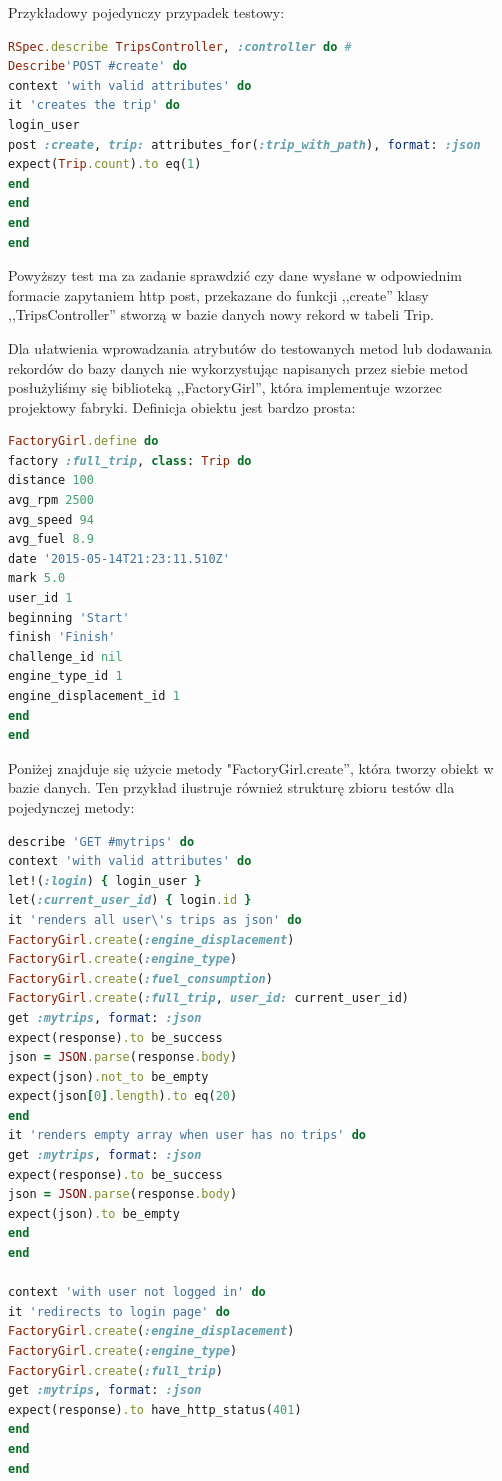 \documentclass[eng,oneside]{mgr}
\begin{document}
Przykładowy pojedynczy przypadek testowy:

\begin{lstlisting}[language=Ruby, caption={RSpec test jednostkowy.}]
RSpec.describe TripsController, :controller do #
Describe'POST #create' do
context 'with valid attributes' do
it 'creates the trip' do
login_user
post :create, trip: attributes_for(:trip_with_path), format: :json
expect(Trip.count).to eq(1)
end
end
end
end
\end{lstlisting}

Powyższy test ma za zadanie sprawdzić czy dane wysłane w odpowiednim formacie zapytaniem http post, przekazane do funkcji ,,create'' klasy ,,TripsController'' stworzą w bazie danych nowy rekord w tabeli Trip. 

Dla ułatwienia wprowadzania atrybutów do testowanych metod lub dodawania rekordów do bazy danych nie wykorzystując napisanych przez siebie metod posłużyliśmy się biblioteką ,,FactoryGirl'', która implementuje wzorzec projektowy fabryki. Definicja obiektu jest bardzo prosta:

\begin{lstlisting}[language=Ruby, caption={Definicja FactoryGirl.}]
FactoryGirl.define do 
factory :full_trip, class: Trip do
distance 100
avg_rpm 2500
avg_speed 94
avg_fuel 8.9
date '2015-05-14T21:23:11.510Z'
mark 5.0
user_id 1
beginning 'Start'
finish 'Finish'
challenge_id nil
engine_type_id 1
engine_displacement_id 1
end
end
\end{lstlisting}

Poniżej znajduje się użycie metody "FactoryGirl.create'', która tworzy obiekt w bazie danych. Ten przykład ilustruje również strukturę zbioru testów dla pojedynczej metody:

\begin{lstlisting}[language=Ruby, caption={Użycie FactoryGirl.}]
describe 'GET #mytrips' do
context 'with valid attributes' do
let!(:login) { login_user }
let(:current_user_id) { login.id }
it 'renders all user\'s trips as json' do
FactoryGirl.create(:engine_displacement)
FactoryGirl.create(:engine_type)
FactoryGirl.create(:fuel_consumption)
FactoryGirl.create(:full_trip, user_id: current_user_id)
get :mytrips, format: :json
expect(response).to be_success
json = JSON.parse(response.body)
expect(json).not_to be_empty
expect(json[0].length).to eq(20)
end
it 'renders empty array when user has no trips' do
get :mytrips, format: :json
expect(response).to be_success
json = JSON.parse(response.body)
expect(json).to be_empty
end
end

context 'with user not logged in' do
it 'redirects to login page' do
FactoryGirl.create(:engine_displacement)
FactoryGirl.create(:engine_type)
FactoryGirl.create(:full_trip)
get :mytrips, format: :json
expect(response).to have_http_status(401)
end
end
end
\end{lstlisting}
\end{document}
